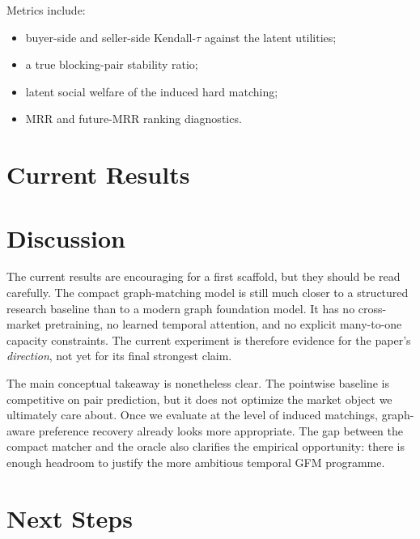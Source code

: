 \documentclass[11pt]{article}
\begin{document}
Metrics include:
\begin{itemize}
  \item buyer-side and seller-side Kendall-$\tau$ against the latent utilities;
  \item a true blocking-pair stability ratio;
  \item latent social welfare of the induced hard matching;
  \item MRR and future-MRR ranking diagnostics.
\end{itemize}

\section{Current Results}


\section{Discussion}

The current results are encouraging for a first scaffold, but they should be
read carefully. The compact graph-matching model is still much closer to a
structured research baseline than to a modern graph foundation model. It has no
cross-market pretraining, no learned temporal attention, and no explicit
many-to-one capacity constraints. The current experiment is therefore evidence
for the paper's \emph{direction}, not yet for its final strongest claim.

The main conceptual takeaway is nonetheless clear. The pointwise baseline is
competitive on pair prediction, but it does not optimize the market object we
ultimately care about. Once we evaluate at the level of induced matchings,
graph-aware preference recovery already looks more appropriate. The gap between
the compact matcher and the oracle also clarifies the empirical opportunity:
there is enough headroom to justify the more ambitious temporal GFM programme.

\section{Next Steps}
\end{document}
